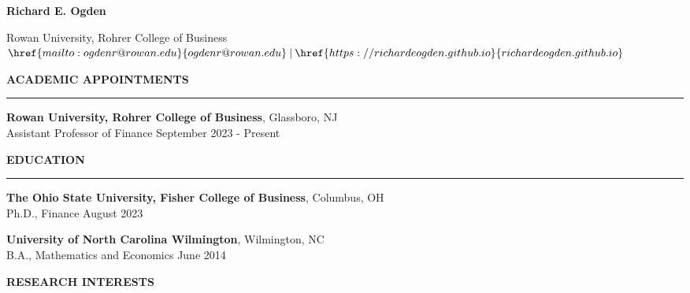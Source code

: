 \documentclass[11pt]{article}
\begin{document}
\setlength{\parindent}{0in}


\begin{center}
{\Large \bf Richard E. Ogden}
\end{center}

\bigskip

\vspace{-0.425in}

\begin{center}
Rowan University, Rohrer College of Business\\

$\href{mailto:ogdenr@rowan.edu}{ogdenr@rowan.edu} \: \vert \: \href{https://richardeogden.github.io}{richardeogden.github.io}$


\vspace{-0.225in}
\end{center}

\vspace{.1in}
\bigskip

\textbf{{\large A}{\footnotesize CADEMIC }{\large A}{\footnotesize PPOINTMENTS}}\vspace{-0.05in}

\rule[5pt]{470pt}{1pt}\vspace{-0.05in}

\textbf{Rowan University, Rohrer College of Business}, Glassboro, NJ\\
Assistant Professor of Finance \hfill  September 2023 - Present

\bigskip

\textbf{{\large E}{\footnotesize DUCATION}}\vspace{-0.05in}

\rule[5pt]{470pt}{1pt}\vspace{-0.05in}

\textbf{The Ohio State University, Fisher College of Business}, Columbus, OH\\
Ph.D., Finance \hfill August 2023 

\bigskip

\textbf{University of North Carolina Wilmington}, Wilmington, NC\\
B.A., Mathematics and Economics \hfill June 2014
\bigskip

\textbf{{\large R}{\footnotesize ESEARCH} {\large I}{\footnotesize NTERESTS}}\vspace{-0.05in}
\end{document}

